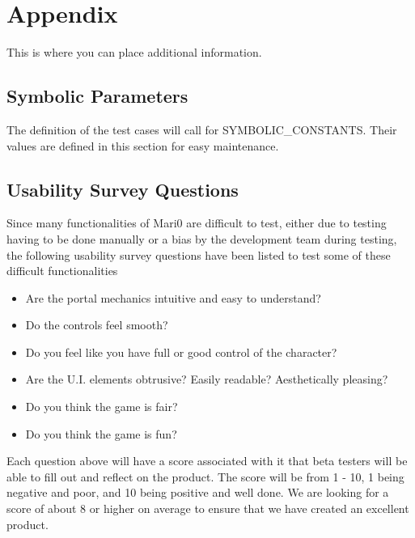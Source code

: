 \documentclass[12pt, titlepage]{article}
\begin{document}


\newpage

\section{Appendix}

This is where you can place additional information.

\subsection{Symbolic Parameters}

The definition of the test cases will call for SYMBOLIC\_CONSTANTS.
Their values are defined in this section for easy maintenance.

\subsection{Usability Survey Questions}

Since many functionalities of Mari0 are difficult to test, either due to testing having to be done manually or a bias by the development team during testing, the following usability survey questions have been listed to test some of these difficult functionalities

\begin{itemize}
  \item Are the portal mechanics intuitive and easy to understand?
  \item Do the controls feel smooth?
  \item Do you feel like you have full or good control of the character?
  \item Are the U.I. elements obtrusive? Easily readable? Aesthetically pleasing?
  \item Do you think the game is fair?
  \item Do you think the game is fun?
\end{itemize}

Each question above will have a score associated with it that beta testers will be able to fill out and reflect on the product. The score will be from 1 - 10, 1 being negative and poor, and 10 being positive and well done. We are looking for a score of about 8 or higher on average to ensure that we have created an excellent product. 
\end{document}
